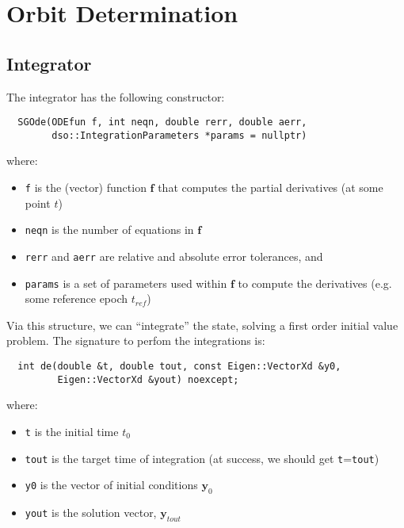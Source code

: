 \chapter{Orbit Determination}
\label{ch:orbit-determination}

\section{Integrator}
\label{sec:Integrator}

The integrator has the following constructor:
\begin{lstlisting}
  SGOde(ODEfun f, int neqn, double rerr, double aerr,                         
        dso::IntegrationParameters *params = nullptr)
\end{lstlisting}

where:
\begin{itemize}
    \item \label{it:odefun} \texttt{f} is the (vector) function $\bm{f}$ that 
        computes the partial derivatives (at some point $t$)
    \item \texttt{neqn} is the number of equations in $\bm{f}$
    \item \texttt{rerr} and \texttt{aerr} are relative and absolute error 
        tolerances, and
    \item \texttt{params} is a set of parameters used within $\bm{f}$ to 
        compute the derivatives (e.g. some reference epoch $t_{ref}$)
\end{itemize}

Via this structure, we can ``integrate'' the state, solving a first order 
initial value problem. The signature to perfom the integrations is:
\begin{lstlisting}
  int de(double &t, double tout, const Eigen::VectorXd &y0,                     
         Eigen::VectorXd &yout) noexcept;
\end{lstlisting}
where:
\begin{itemize}
    \item \texttt{t} is the initial time $t_0$
    \item \texttt{tout} is the target time of integration (at success, we 
        should get \texttt{t}=\texttt{tout})
    \item \texttt{y0} is the vector of initial conditions $\bm{y}_0$
    \item \texttt{yout} is the solution vector, $\bm{y}_{tout}$
\end{itemize}

